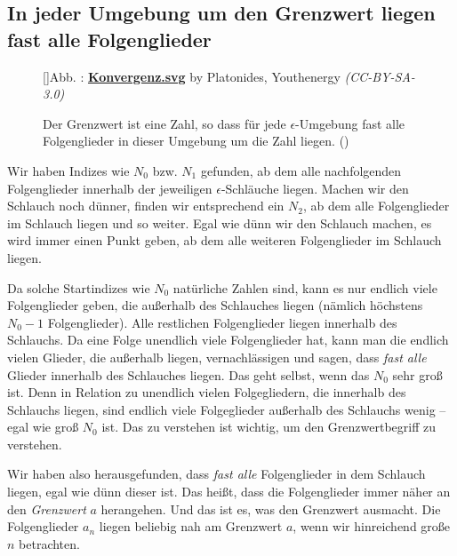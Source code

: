 \documentclass[fontsize=9pt,
               parskip=half-,
               DIV=14,
               listof=chapterentry,
               tocflat]{scrbook}
\newcounter{imagelabel}
\begin{document}
\subsection{In jeder Umgebung um den Grenzwert liegen fast alle Folgenglieder}

\begin{figure}[h]
\vspace{\baselineskip}
[]{Abb. : \protect\href{https://commons.wikimedia.org/wiki/File:Konvergenz.svg}{\textbf{Konvergenz.svg}} by Platonides, Youthenergy \textit{(CC-BY-SA-3.0)}}\centering
{}
\caption*{Der Grenzwert ist eine Zahl, so dass für jede $\epsilon $-Umgebung fast alle Folgenglieder in dieser Umgebung um die Zahl liegen. ()}
\end{figure}
Wir haben Indizes wie $N_{0}$ bzw. $N_{1}$ gefunden, ab dem alle nachfolgenden Folgenglieder innerhalb der jeweiligen $\epsilon $-Schläuche liegen. Machen wir den Schlauch noch dünner, finden wir entsprechend ein $N_{2}$, ab dem alle Folgenglieder im Schlauch liegen und so weiter. Egal wie dünn wir den Schlauch machen, es wird immer einen Punkt geben, ab dem alle weiteren Folgenglieder im Schlauch liegen.

Da solche Startindizes wie $N_{0}$ natürliche Zahlen sind, kann es nur endlich viele Folgenglieder geben, die außerhalb des Schlauches liegen (nämlich höchstens $N_{0}-1$ Folgenglieder). Alle restlichen Folgenglieder liegen innerhalb des Schlauchs. Da eine Folge unendlich viele Folgenglieder hat, kann man die endlich vielen Glieder, die außerhalb liegen, vernachlässigen und sagen, dass \emph{fast alle} Glieder innerhalb des Schlauches liegen. Das geht selbst, wenn das $N_{0}$ sehr groß ist. Denn in Relation zu unendlich vielen Folgegliedern, die innerhalb des Schlauchs liegen, sind endlich viele Folgeglieder außerhalb des Schlauchs wenig – egal wie groß $N_{0}$ ist. Das zu verstehen ist wichtig, um den Grenzwertbegriff zu verstehen.

Wir haben also herausgefunden, dass \emph{fast alle} Folgenglieder in dem Schlauch liegen, egal wie dünn dieser ist. Das heißt, dass die Folgenglieder immer näher an den \emph{Grenzwert} $a$ herangehen. Und das ist es, was den Grenzwert ausmacht. Die Folgenglieder $a_{n}$ liegen beliebig nah am Grenzwert $a$, wenn wir hinreichend große $n$ betrachten.
\end{document}
